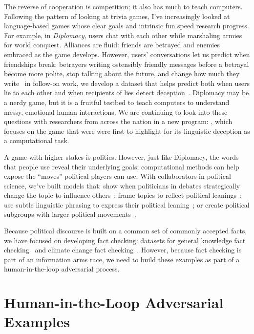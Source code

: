 The reverse of cooperation is competition; it also has much to teach computers.
%
Following the pattern of looking at trivia games, I've increasingly looked at language-based games whose clear goals and
intrinsic fun speed research progress.
%
For example, in \emph{Diplomacy}, users
chat with each other while marshaling armies for world conquest. Alliances are
fluid: friends are betrayed and enemies embraced as the game develops. However,
users' conversations let us predict when friendships break: betrayers writing
ostensibly friendly messages before a betrayal become more polite, stop talking
about the future, and change how much they write~\cite{niculae-15} in follow-on
work, we develop a dataset that helps predict both when users lie to each other
and when recipients of lies detect deception~\cite{Peskov-20}.
%
Diplomacy may be
a nerdy game, but it is a fruitful testbed to teach computers to understand
messy, emotional human interactions.
%
We are continuing to look into these questions with researchers from
across the nation in a new  program: , which focuses
on the game that were were first to highlight for its linguistic deception as a computational task.

A game with higher stakes is politics. However, just like Diplomacy, the words
that people use reveal their underlying goals; computational methods can help
expose the ``moves'' political players can use. With collaborators in political
science, we've built models that: show when politicians in debates
strategically change the topic to influence others~\cite{nguyen-12,Nguyen-14b};
frame topics to reflect political leanings~\cite{nguyen-13:shlda}; use subtle
linguistic phrasing to express their political leaning~\cite{iyyer-14a}; or
create political subgroups with larger political
movements~\cite{Nguyen:Boyd-Graber:Resnik:Miler-2015}.

Because political discourse is built on a common set of commonly
accepted facts, we have focused on developing fact checking: datasets
for general knowledge fact checking~\cite{eisenschlos-21} and climate
change fact checking~\cite{20-diggelmann}.
%
However, because fact checking is part of an information arms race, we
need to build these examples as part of a human-in-the-loop
adversarial process.

\section{Human-in-the-Loop Adversarial Examples}

